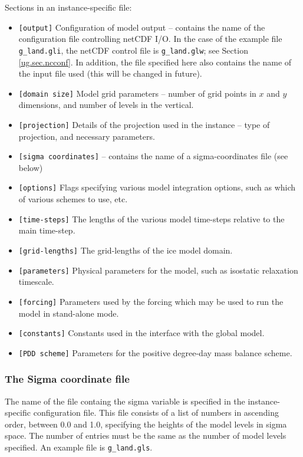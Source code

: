 Sections in an instance-specific file:
%
\begin{itemize}
\item \texttt{[output]} Configuration of model output -- contains the name of
  the configuration file controlling netCDF I/O. In the case of the example file
  \texttt{g\_land.gli}, the netCDF control file is \texttt{g\_land.glw}; see
  Section \ref{ug.sec.ncconf}. In addition, the file specified here also
  contains the name of the input file used (this will be changed in future).
\item \texttt{[domain size]} Model grid parameters -- number of grid points in $x$ and
  $y$ dimensions, and number of levels in the vertical.
\item \texttt{[projection]} Details of the projection used in the instance -- type of
  projection, and necessary parameters.
\item \texttt{[sigma coordinates]} -- contains the name of a
  sigma-coordinates file (see below)
\item \texttt{[options]} Flags specifying various model integration options, such
  as which of various schemes to use, etc.
\item \texttt{[time-steps]} The lengths of the various model time-steps
  relative to the main time-step.
\item \texttt{[grid-lengths]} The grid-lengths of the ice model domain.
\item \texttt{[parameters]} Physical parameters for the model, such as isostatic
  relaxation timescale.
\item \texttt{[forcing]} Parameters used by the forcing which may be used to run
  the model in stand-alone mode.
\item \texttt{[constants]} Constants used in the interface with the global
  model.
\item \texttt{[PDD scheme]} Parameters for the positive degree-day mass
  balance scheme.
\end{itemize}
%
\subsubsection{The Sigma coordinate file}
%
The name of the file containg the sigma variable is specified in
the instance-specific configuration file. This file consists of a
list of numbers in ascending order, between 0.0 and 1.0, specifying the
heights of the model levels in sigma space. The number of entries must be the
same as the number of model levels specified. An example file is
\texttt{g\_land.gls}.


